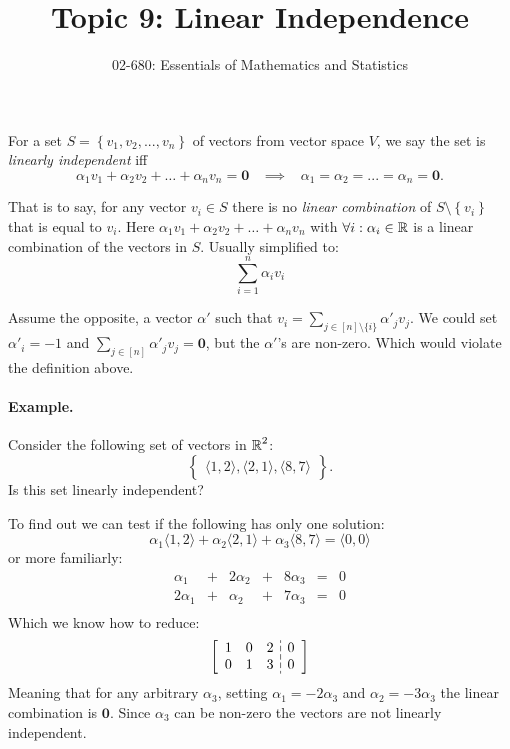 


\title{Topic 9: Linear Independence}
\author{02-680: Essentials of Mathematics and Statistics}


\maketitle

For a set $S=\left\{v_1,v_2,...,v_n\right\}$ of vectors from vector space $V$, 
we say the set is \emph{linearly independent} iff 
\[
\alpha_1v_1 + \alpha_2v_2 + \hdots + \alpha_nv_n = \mathbf{0} \;\;\;\implies\;\;\; \alpha_1=\alpha_2=...=\alpha_n = \mathbf{0}.
\]

That is to say, for any vector $v_i\in S$ there is no \emph{linear combination} of $S\setminus\left\{v_i\right\}$ that is equal to $v_i$. 
Here $\alpha_1v_1 + \alpha_2v_2 + \hdots + \alpha_nv_n$ with $\forall i: \alpha_i\in\operatorname{\mathbb{R}}$ is a linear combination of the vectors in $S$.
Usually simplified to:  \[\sum_{i=1}^n \alpha_iv_i\]

Assume the opposite, a vector $\alpha'$ such that $v_i = \sum_{j\in [n]\setminus\{i\}}\alpha'_jv_j$. 
We could set $\alpha'_i=-1$
and $\sum_{j\in [n]}\alpha'_jv_j=\mathbf{0}$, but the $\alpha'$'s are non-zero. 
Which would violate the definition above.

\paragraph{Example.} Consider the following set of vectors in $\operatorname{\mathbb{R}}^2$:
\[\left\{\begin{matrix}
\langle1,2\rangle,
\langle2,1\rangle,
\langle8,7\rangle
\end{matrix}\right\}.\]
Is this set linearly independent? 

To find out we can test if the following has only one solution: 
\[\alpha_1 \langle1,2\rangle +
\alpha_2 \langle2,1\rangle +
\alpha_3 \langle8,7\rangle =
\langle0,0\rangle\]
or more familiarly: 
\[
\begin{array}{rcrcrcr}
\alpha_1 & + & 2\alpha_2 & + & 8 \alpha_3 & = & 0\\
2\alpha_1 & + & \alpha_2 & + & 7 \alpha_3 & = & 0\\
\end{array}
\]
Which we know how to reduce: 
\[
\left[
\begin{array}{ccc;{4pt/2pt}c}
1 & 0 & 2 & 0\\
0 & 1 & 3 & 0\\
\end{array}
\right]
\]
Meaning that for any arbitrary $\alpha_3$, setting $\alpha_1 = -2\alpha_3$ and $\alpha_2 = -3\alpha_3$ the linear combination is $\mathbf{0}$. 
Since $\alpha_3$ can be non-zero the vectors are not linearly independent. 



